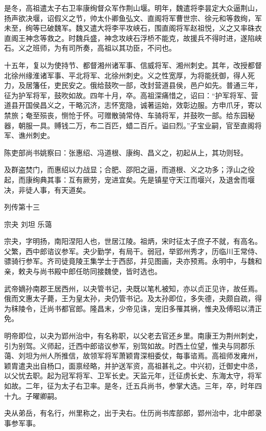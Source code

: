 \documentclass[12pt,UTF8]{ctexbook}
\begin{document}
是冬，高祖遣太子右卫率康绚督众军作荆山堰。明年，魏遣将李昙定大众逼荆山，扬声欲决堰，诏假义之节，帅太仆卿鱼弘文、直阁将军曹世宗、徐元和等救绚，军未至，绚等已破魏军。魏又遣大将李平攻峡石，围直阁将军赵祖悦，义之又率硃衣直阁王神念等救之。时魏兵盛，神念攻峡石浮桥不能克，故援兵不得时进，遂陷峡石。义之班师，为有司所奏，高祖以其功臣，不问也。

十五年，复以为使持节、都督湘州诸军事、信威将军、湘州刺史。其年，改授都督北徐州缘淮诸军事、平北将军、北徐州刺史。义之性宽厚，为将能抚御，得人死力，及居籓任，吏民安之。俄给鼓吹一部，改封营道县侯，邑户如先。普通三年，征为护军将军，鼓吹如故。四年十月，卒。高祖深痛惜之，诏曰：“护军将军、营道县开国侯昌义之，干略沉济，志怀宽隐，诚著运始，效彰边服。方申爪牙，寄以禁旅；奄至殒丧，恻怆于怀。可赠散骑常侍、车骑将军，并鼓吹一部。给东园秘器，朝服一具。赙钱二万，布二百匹，蜡二百斤。谥曰烈。”子宝业嗣，官至直阁将军、谯州刺史。

陈吏部尚书姚察曰：张惠绍、冯道根、康绚、昌义之，初起从上，其功则轻。

及群盗焚门，而惠绍以力战显；合肥、邵阳之逼，而道根、义之功多；浮山之役起，而康绚典其事：互有厥劳，宠进宜矣。先是镇星守天江而堰兴，及退舍而堰决，非徒人事，有天道矣。





列传第十三

宗夬 刘坦 乐蔼

宗夬，字明扬，南阳涅阳人也，世居江陵。祖炳，宋时征太子庶子不就，有高名。父繁，西中郎谘议参军。夬少勤学，有局干。弱冠，举郢州秀才，历临川王常侍、骠骑行参军。齐司徒竟陵王集学士于西邸，并见图画，夬亦预焉。永明中，与魏和亲，敕夬与尚书殿中郎任昉同接魏使，皆时选也。

武帝嫡孙南郡王居西州，以夬管书记，夬既以笔札被知，亦以贞正见许，故任焉。俄而文惠太子薨，王为皇太孙，夬仍管书记。及太孙即位，多失德，夬颇自疏，得为秣陵令，迁尚书都官郎。隆昌末，少帝见诛，宠旧多罹其祸，惟夬及傅昭以清正免。

明帝即位，以夬为郢州治中，有名称职，以父老去官还乡里。南康王为荆州刺史，引为别驾。义师起，迁西中郎谘议参军，别驾如故。时西土位望，惟夬与同郡乐蔼、刘坦为州人所推信，故领军将军萧颖胄深相委仗，每事谘焉。高祖师发雍州，颖胄遣夬出自杨口，面禀经略，并护送军资，高祖甚礼之。中兴初，迁御史中丞，以父忧去职。起为冠军将军、卫军长史。天监元年，迁征虏长史、东海太守，将军如故。二年，征为太子右卫率。是冬，迁五兵尚书，参掌大选。三年，卒，时年四十九。子曜卿嗣。

夬从弟岳，有名行，州里称之，出于夬右。仕历尚书库部郎，郢州治中，北中郎录事参军事。
\end{document}
